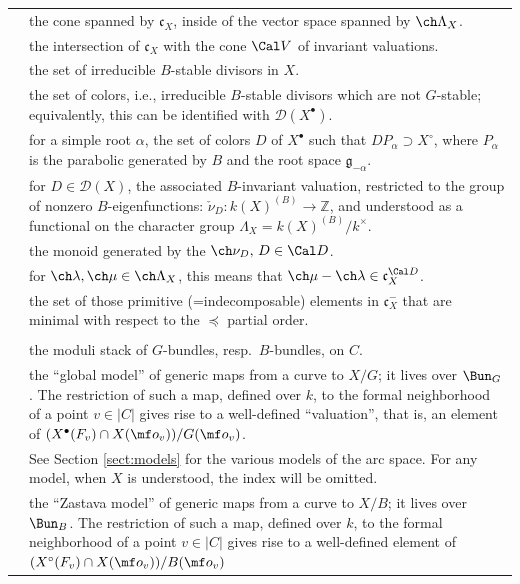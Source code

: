 \documentclass[final]{amsart}
\theoremstyle{remark}
\theoremstyle{definition}
\numberwithin{equation}{section}
\begin{document}
\begin{longtable}{>{\raggedleft}p{} p{} }
{$\Cal C_0=\Cal C_0(X)\subset \mathfrak t_X$} & 
{the cone spanned by $\mathfrak c_X$, inside of the vector space spanned by $\ch\Lambda_X$.} \\
{$\mathfrak c_X^-$} & {the intersection of $\mathfrak c_X$ with the cone $\Cal V$ of invariant valuations.} \\
{$\mathcal D(X)$} & {the set of irreducible $B$-stable divisors in $X$.} \\
{$\mathcal D$} & {the set of colors, i.e., irreducible $B$-stable divisors which are not $G$-stable; equivalently, this can be identified with $\mathcal D(X^\bullet)$.} \\
{$\mathcal D(\alpha)$} & {for a simple root $\alpha$, the set of colors $D$ of $X^\bullet$ such that $D P_\alpha \supset X^\circ$, 
where $P_\alpha$ is the parabolic generated by $B$ and the root space $\mathfrak g_{-\alpha}$.}\\
{$\varrho_X(D)=\ch\nu_D$}&{for $D\in \mathcal D(X)$, the associated $B$-invariant valuation, restricted to the group of nonzero $B$-eigenfunctions: $\check \nu_D: k(X)^{(B)} \to \mathbb Z$, and understood as  a functional on the character group $\Lambda_X = k(X)^{(B)}/k^\times$.}\\
{$\mathfrak c_X^{\Cal D} \subset\ch\Lambda_X$} & 
the monoid generated by the $\ch\nu_D,\, D\in \Cal D$.  \\
{$\ch\lambda\preceq \ch\mu$} & {for $\ch\lambda,\ch\mu\in \ch\Lambda_X$, this means that 
$\ch\mu-\ch\lambda \in \mathfrak c_X^{\Cal D}$.} \\
{$\Cal D^G_{\mathrm{sat}}(X)$} & {the set of those primitive (=indecomposable) elements in $\mathfrak c_X^-$ that
are minimal with respect to the $\preceq$ partial order.}
\\
&\\
{$\Bun_G, \Bun_B$} & {the moduli stack of $G$-bundles, resp.\ $B$-bundles, on $C$.} \\
{$\sM_{X}$} & the ``global model'' of generic maps from a curve to $X/G$; it lives over $\Bun_G$. The restriction of such a map, defined over $k$, to the formal neighborhood of a point $v\in |C|$ gives rise to a well-defined ``valuation'', that is, an element of $(X^\bullet(F_v)\cap X(\mf o_v))/G(\mf o_v)$. 
\\
& See Section \ref{sect:models} for the various models of the arc space. For any model, when $X$ is understood, the index will be omitted. \\
{$\sY_X$} & {the ``Zastava model'' of generic maps from a curve to $X/B$; it lives over $\Bun_B$. The restriction of such a map, defined over $k$, to the formal neighborhood of a point $v\in |C|$ gives rise to a well-defined element of $(X^\circ(F_v)\cap X(\mf o_v))/B(\mf o_v)$} \\

\end{longtable}
\end{document}
